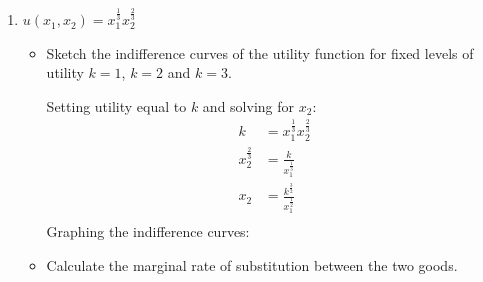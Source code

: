 \documentclass[12pt]{article}
\newcounter{question}[section]
\newenvironment{subquestions}{
  \begin{enumerate}[label=(\roman*)]}{\end{enumerate}}
\begin{document}
\begin{subquestions}
\begin{itemize}
        \textcolor{solution-color}{
          When $x_1=3$ and $x_2=1$, we can see that the indifference curve is
          flat and hence its slope is 0. Since the slope of the indifference curve
          at a point is the same as the marginal rate of subsitution at that
          point, we have $MRS=0$. This means that the consumer would be willing
          to give up a small amoumt of $x_1$ in return for zero $x_2$. The
          consumer is willing to throw away some $x_1$ without getting any
          $x_2$ in return.
        }
    \end{itemize}
  \item $u\left( x_1, x_2 \right)=x_1^{\frac{1}{3}}x_2^{\frac{2}{3}}$
    \begin{itemize}
      \item Sketch the indifference curves of the utility function for
        fixed levels of utility $k=1$, $k=2$ and $k=3$.

        \textcolor{solution-color}{
          Setting utility equal to $k$ and solving for $x_2$:
          \begin{align*}
            k&=x_1^{\frac{1}{3}}x_2^{\frac{2}{3}}\\
            x_2^{\frac{2}{3}}&=\frac{k}{x_1^{\frac{1}{3}}}\\
            x_2&=\frac{k^{\frac{3}{2}}}{x_1^{\frac{1}{2}}}\\
          \end{align*}
          Graphing the indifference curves:
          \begin{center}
          \end{center}
        }
      \item Calculate the marginal rate of substitution between the two
        goods.


\end{itemize}
\end{subquestions}
\end{document}
